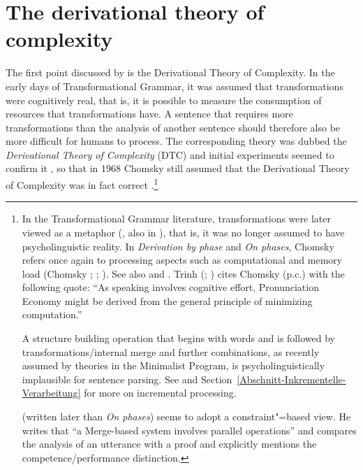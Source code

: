 \section{The derivational theory of complexity}
\label{sec-dtc}

The first point discussed by \citet{SW2011a} is the Derivational Theory of Complexity.
In  the early days of Transformational Grammar,
it was assumed that transformations were cognitively real, that is, it is possible to measure the consumption of resources
that transformations have.
A sentence that requires more transformations than the analysis of another sentence should therefore also be more difficult for humans
to process. The corresponding theory was dubbed the \emph{Derivational Theory of Complexity} (DTC) and initial experiments
seemed to confirm it \citep{MMK64a,SP65a,CO66a}, so that in 1968 Chomsky still assumed that the
\pagebreak
Derivational Theory of Complexity was in fact correct
\citep[--250]{Chomsky76b-u}.\footnote{%
In the Transformational Grammar literature, transformations were later viewed as a metaphor
(\citealp[]{Lohnstein2014a}, also in \citealp[Footnote~4]{Chomsky2001a-u}), that is,
it was no longer assumed to have psycholinguistic reality. In \emph{Derivation by phase} and
\emph{On phases}, Chomsky refers once again to processing aspects such as computational and memory load (Chomsky \citeyear[, 12,
   15]{Chomsky2001a-u}; \citeyear[, 12]{Chomsky2007a}; \citeyear[, 145, 146,
   155]{Chomsky2008a}). See also  and
. Trinh (\citeyear[]{Trinh2011a}; \citeyear[]{Trinh2019a}) cites Chomsky (p.c.) with the following quote:
``As speaking involves cognitive effort, Pronunciation Economy might be derived from the general principle of minimizing computation.'' 

  A structure building operation that begins with words and is followed by transformations/internal
  merge and further combinations, as recently assumed by theories in the Minimalist Program,
  is psycholinguistically implausible for sentence parsing. See  and Section~\ref{Abschnitt-Inkrementelle-Verarbeitung} for
  more on incremental processing.

  \citet[]{Chomsky2007a} (written later than \emph{On phases}) seems to adopt a constraint"=based view. He writes that ``a Merge-based system involves parallel operations''
  and compares the analysis of an utterance with a proof and explicitly mentions the competence/performance distinction.
} 
